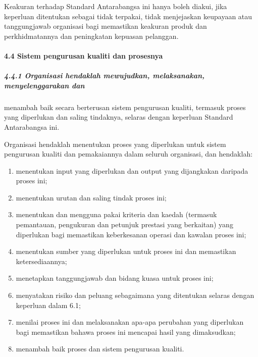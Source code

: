 \documentclass[
]{article}
\begin{document}
Keakuran terhadap Standard Antarabangsa ini hanya boleh diakui, jika
keperluan ditentukan sebagai tidak terpakai, tidak menjejaskan keupayaan
atau tanggungjawab organisasi bagi memastikan keakuran produk dan
perkhidmatannya dan peningkatan kepuasan pelanggan.

\hypertarget{sistem-pengurusan-kualiti-dan-prosesnya}{%
\paragraph{4.4 Sistem pengurusan kualiti dan
prosesnya}\label{sistem-pengurusan-kualiti-dan-prosesnya}}

\hypertarget{organisasi-hendaklah-mewujudkan-melaksanakan-menyelenggarakan-dan}{%
\subparagraph{4.4.1 Organisasi hendaklah mewujudkan, melaksanakan,
menyelenggarakan
dan}\label{organisasi-hendaklah-mewujudkan-melaksanakan-menyelenggarakan-dan}}

menambah baik secara berterusan sistem pengurusan kualiti, termasuk
proses yang diperlukan dan saling tindaknya, selaras dengan keperluan
Standard Antarabangsa ini.

Organisasi hendaklah menentukan proses yang diperlukan untuk sistem
pengurusan kualiti dan pemakaiannya dalam seluruh organisasi, dan
hendaklah:

\begin{enumerate}
\def\labelenumi{\alph{enumi})}
\item
  menentukan input yang diperlukan dan output yang dijangkakan daripada
  proses ini;
\item
  menentukan urutan dan saling tindak proses ini;
\item
  menentukan dan mengguna pakai kriteria dan kaedah (termasuk
  pemantauan, pengukuran dan petunjuk prestasi yang berkaitan) yang
  diperlukan bagi memastikan keberkesanan operasi dan kawalan proses
  ini;
\item
  menentukan sumber yang diperlukan untuk proses ini dan memastikan
  ketersediaannya;
\item
  menetapkan tanggungjawab dan bidang kuasa untuk proses ini;
\item
  menyatakan risiko dan peluang sebagaimana yang ditentukan selaras
  dengan keperluan dalam 6.1;
\item
  menilai proses ini dan melaksanakan apa-apa perubahan yang diperlukan
  bagi memastikan bahawa proses ini mencapai hasil yang dimaksudkan;
\item
  menambah baik proses dan sistem pengurusan kualiti.
\end{enumerate}
\end{document}
